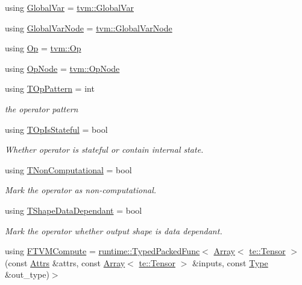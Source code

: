 \begin{DoxyCompactItemize}
\item 
using \hyperlink{namespacetvm_1_1relay_a81ac7c3d0824529fddce7849c9c66289}{Global\+Var} = \hyperlink{classtvm_1_1GlobalVar}{tvm\+::\+Global\+Var}
\item 
using \hyperlink{namespacetvm_1_1relay_afe7144195dbbc914183189444ef6a347}{Global\+Var\+Node} = \hyperlink{classtvm_1_1GlobalVarNode}{tvm\+::\+Global\+Var\+Node}
\item 
using \hyperlink{namespacetvm_1_1relay_a6c46d15e80f1a9916b8e9c264a185c98}{Op} = \hyperlink{classtvm_1_1Op}{tvm\+::\+Op}
\item 
using \hyperlink{namespacetvm_1_1relay_ac9d4f2cf78a48659817a88d890e1d142}{Op\+Node} = \hyperlink{classtvm_1_1OpNode}{tvm\+::\+Op\+Node}
\item 
using \hyperlink{namespacetvm_1_1relay_a5dab2ddae20ac7564a81ab3a0a9aba76}{T\+Op\+Pattern} = int
\begin{DoxyCompactList}\small\item\em the operator pattern \end{DoxyCompactList}\item 
using \hyperlink{namespacetvm_1_1relay_afb8a8d4dd43830d4ce7d566abcd1c450}{T\+Op\+Is\+Stateful} = bool
\begin{DoxyCompactList}\small\item\em Whether operator is stateful or contain internal state. \end{DoxyCompactList}\item 
using \hyperlink{namespacetvm_1_1relay_ab4c835287dfc5ec074ea8431bcebbb17}{T\+Non\+Computational} = bool
\begin{DoxyCompactList}\small\item\em Mark the operator as non-\/computational. \end{DoxyCompactList}\item 
using \hyperlink{namespacetvm_1_1relay_a75252d8d7e8d18b796074ffe4cc9f3ff}{T\+Shape\+Data\+Dependant} = bool
\begin{DoxyCompactList}\small\item\em Mark the operator whether output shape is data dependant. \end{DoxyCompactList}\item 
using \hyperlink{namespacetvm_1_1relay_a63a0893a8379998657ddff39a3162188}{F\+T\+V\+M\+Compute} = \hyperlink{classtvm_1_1runtime_1_1TypedPackedFunc}{runtime\+::\+Typed\+Packed\+Func}$<$ \hyperlink{classtvm_1_1Array}{Array}$<$ \hyperlink{classtvm_1_1te_1_1Tensor}{te\+::\+Tensor} $>$(const \hyperlink{classtvm_1_1Attrs}{Attrs} \&attrs, const \hyperlink{classtvm_1_1Array}{Array}$<$ \hyperlink{classtvm_1_1te_1_1Tensor}{te\+::\+Tensor} $>$ \&inputs, const \hyperlink{namespacetvm_1_1relay_a661d95f170bca230773914caeef3fe52}{Type} \&out\+\_\+type)$>$

\end{DoxyCompactItemize}
